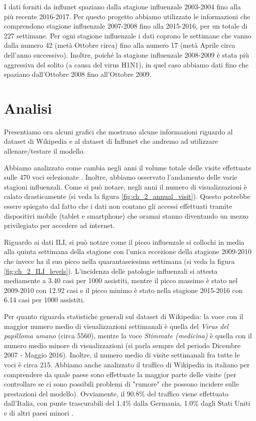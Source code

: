 I dati forniti da influnet spaziano dalla stagione influenzale 2003-2004 fino alla più recente 2016-2017. Per questo progetto 
abbiamo utilizzato le informazioni che comprendono stagione influenzale 2007-2008 fino alla 2015-2016, per un totale di 227 
settimane. Per ogni stagione influenzale i dati coprono le settimane che vanno dalla numero 42 (metà Ottobre circa) fino alla 
numero 17 (metà Aprile circa dell'anno successivo). Inoltre, poiché la stagione influenzale 2008-2009 è stata più aggressiva 
del solito (a causa del virus H1N1), in quel caso abbiamo dati fino che spaziano dall'Ottobre 2008 fino all'Ottobre 2009.

\section{Analisi}
\bigskip

Presentiamo ora alcuni grafici che mostrano alcune informazioni riguardo al dataset di Wikipedia e al dataset di Influnet che andremo ad utilizzare allenare/testare il modello. 
\bigskip

Abbiamo analizzato come cambia negli anni il volume totale delle visite effettuate sulle 470 voci selezionate . Inoltre, 
abbiamo osservato l'andamento delle varie stagioni influenzali. Come si può notare, negli anni il numero di visualizzazioni è 
calato drasticamente (si veda la figura \ref{fig:ch_2_annual_visit}). Questo potrebbe essere spiegato dal fatto che i dati 
non contano gli accessi effettuati tramite dispositivi mobile (tablet e smartphone) che oramai stanno diventando un mezzo 
privilegiato per accedere ad internet.
\bigskip

Riguardo ai dati ILI, si può notare come il picco influenzale si collochi in media alla quinta settimana della stagione con 
l'unica eccezione della stagione 2009-2010 che invece ha il suo picco nella quarantaseiesima settimana  (si veda la 
figura \ref{fig:ch_2_ILI_levels}). L'incidenza delle patologie influenzali si attesta mediamente a 3.40 casi per 1000 
assistiti, mentre il picco massimo è stato nel 2009-2010 con 12.92 casi e il picco minimo è stato nella stagione 2015-2016 
con 6.14 casi per 1000 assistiti.
\bigskip

Per quanto riguarda statistiche generali sul dataset di Wikipedia: la voce con il maggior numero medio di visualizzazioni settimanali è quella del \textit{Virus del papilloma umano} (circa 5560), mentre la voce \textit{Stimmate (medicina)} è quella con il numero medio minore di visualizzazioni (si parla sempre del periodo Dicembre 2007 - Maggio 2016). Inoltre, il numero medio di visite settimanali fra tutte le voci è circa 215. Abbiamo anche analizzato il traffico di Wikipedia in italiano per comprendere da quale paese sono effettuate la maggior parte delle visite (per controllare se ci sono possibili problemi di "rumore" che possono incidere sulle prestazioni del modello). Ovviamente, il 90.8\% del traffico viene effettuato dall'Italia, con punte trascurabili del 1.4\% dalla Germania, 1.0\% dagli Stati Uniti e di altri paesi minori \cite{WikipediaStatsCountry}.
\bigskip

